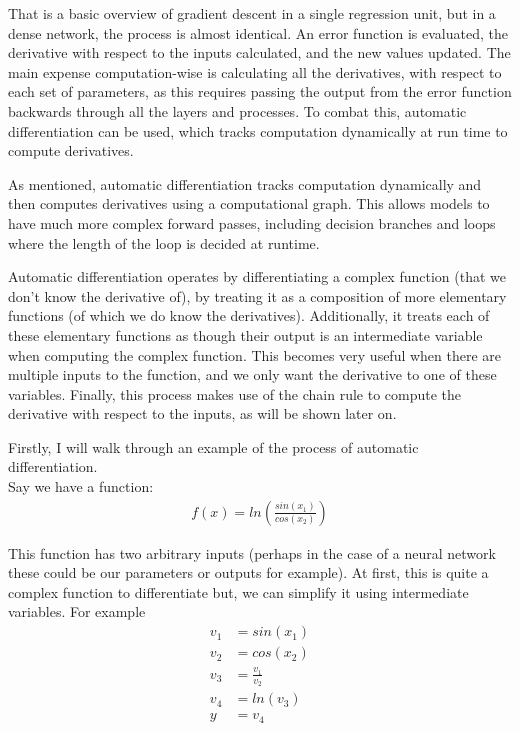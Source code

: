 \documentclass{article}
\makeatletter
\newcommand\subsubsubsection{\@startsection{paragraph}{4}{\z@}{-2.5ex\@plus -1ex \@minus -.25ex}{1.25ex \@plus .25ex}{\normalfont\normalsize\bfseries}}
\makeatother
\begin{document}
    That is a basic overview of gradient descent in a single regression unit, but in a dense network, the process is almost identical. An error function is evaluated, 
    the derivative with respect to the inputs calculated, and the new values updated. The main expense computation-wise is calculating all the derivatives, with respect to
    each set of parameters, as this requires passing the output from the error function backwards through all the layers and processes. To combat this, automatic differentiation
    can be used, which tracks computation dynamically at run time to compute derivatives.

    \subsubsubsection{Automatic Differentiation}
    As mentioned, automatic differentiation tracks computation dynamically and then computes derivatives using a computational graph. This allows models to
    have much more complex forward passes, including decision branches and loops where the length of the loop is decided at runtime.

    Automatic differentiation operates by differentiating a complex function (that we don't know the derivative of), by treating it as a composition of more elementary functions
    (of which we do know the derivatives). Additionally, it treats each of these elementary functions as though their output is an intermediate variable when computing the
    complex function. This becomes very useful when there are multiple inputs to the function, and we only want the derivative to one of these variables. Finally, this process
    makes use of the chain rule to compute the derivative with respect to the inputs, as will be shown later on.

    Firstly, I will walk through an example of the process of automatic differentiation.\\
    \noindent Say we have a function: \begin{align}
        f(x) = ln\left(\frac{sin(x_1)}{cos(x_2)}\right)
    \end{align}

    This function has two arbitrary inputs (perhaps in the case of a neural network these could be our parameters or outputs for example). At first, this is quite a complex
    function to differentiate but, we can simplify it using intermediate variables. For example \begin{align}
        v_1 &= sin(x_1)\\
        v_2 &= cos(x_2)\\
        v_3 &= \frac{v_1}{v_2}\\
        v_4 &= ln(v_3)\\
        y &= v_4
    \end{align}
\end{document}
